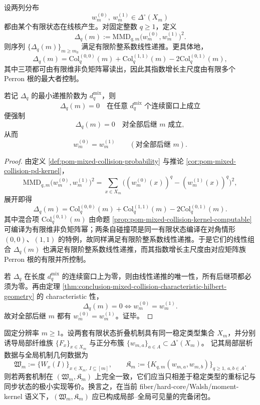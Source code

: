 \begin{theorem}\label{thm:conclusion-mixed-collision-finite-state-mmd-recurrence}
设两列分布
\[
w_m^{(0)},\ w_m^{(1)}\in \Delta^\circ(X_m)
\]
都由某个有限状态在线核产生。对固定整数 \(q\ge 1\)，定义
\[
\Delta_q(m):=\mathrm{MMD}_{q,m}\!\bigl(w_m^{(0)},w_m^{(1)}\bigr)^2.
\]
则序列 \(\{\Delta_q(m)\}_{m\ge m_0}\) 满足有限阶整系数线性递推。更具体地，
\[
\Delta_q(m)
=\mathrm{Col}^{(0,0)}_q(m)+\mathrm{Col}^{(1,1)}_q(m)-2\mathrm{Col}^{(0,1)}_q(m),
\]
其中三项都可由有限维非负矩阵幂读出，因此其指数增长主尺度由有限多个 Perron 根的最大者控制。

若记 \(\Delta_q\) 的最小递推阶数为 \(d_q^{\mathrm{mix}}\)，则
\[
\Delta_q(m)=0\quad\text{在任意 }d_q^{\mathrm{mix}}\text{ 个连续窗口上成立}
\]
便强制
\[
\Delta_q(m)=0\quad\text{对全部后继 }m\text{ 成立},
\]
从而
\[
w_m^{(0)}=w_m^{(1)}
\qquad
(\text{对全部后继 }m).
\]
\end{theorem}
\begin{proof}
由定义 \ref{def:pom-mixed-collision-probability} 与推论 \ref{cor:pom-mixed-collision-pd-kernel}，
\[
\mathrm{MMD}_{q,m}\!\bigl(w_m^{(0)},w_m^{(1)}\bigr)^2
=\sum_{x\in X_m}\bigl((w_m^{(0)}(x))^q-(w_m^{(1)}(x))^q\bigr)^2,
\]
展开即得
\[
\Delta_q(m)
=\mathrm{Col}^{(0,0)}_q(m)+\mathrm{Col}^{(1,1)}_q(m)-2\mathrm{Col}^{(0,1)}_q(m).
\]
其中混合项 \(\mathrm{Col}^{(0,1)}_q(m)\) 由命题 \ref{prop:pom-mixed-collision-kernel-computable} 可编译为有限维非负矩阵幂；两条自碰撞项是同一有限状态编译在对角情形 \((0,0)\)、\((1,1)\) 的特例，故同样满足有限阶整系数线性递推。于是它们的线性组合 \(\Delta_q(m)\) 也满足有限阶整系数线性递推，而其指数增长主尺度由对应矩阵族 Perron 根的有限并所控制。

若 \(\Delta_q\) 在长度 \(d_q^{\mathrm{mix}}\) 的连续窗口上为零，则由线性递推的唯一性，所有后继项都必须为零。再由定理 \ref{thm:conclusion-mixed-collision-characteristic-hilbert-geometry} 的 characteristic 性，
\[
\Delta_q(m)=0
\iff
w_m^{(0)}=w_m^{(1)}.
\]
故对全部后继 \(m\) 都有 \(w_m^{(0)}=w_m^{(1)}\)。证毕。
\end{proof}

\begin{conjecture}\label{conj:conclusion-walsh-hardcore-mixed-collision-complete-closure}
固定分辨率 \(m\ge 1\)。设两套有限状态折叠机制具有同一稳定类型集合 \(X_m\)，并分别诱导局部纤维族 \(\{F_x\}_{x\in X_m}\) 与正分布簇 \(\{w_{m,a}\}_{a\in A}\subset \Delta^\circ(X_m)\)。
记其局部层析数据与全局机制几何数据为
\[
\mathfrak W_m:=\{W_x(I)\}_{x\in X_m,\ I\subseteq[m]},
\qquad
\mathfrak K_m:=\{K_{q,m}(w_{m,a},w_{m,b})\}_{q\ge 1,\ a,b\in A}.
\]
则若两套机制在 \((\mathfrak W_m,\mathfrak K_m)\) 上完全一致，它们应当只相差于稳定类型的重标记与同步状态的极小实现等价。换言之，在当前 fiber/hard-core/Walsh/moment-kernel 语义下，\((\mathfrak W_m,\mathfrak K_m)\) 应已构成局部--全局可见量的完备闭包。
\end{conjecture}
